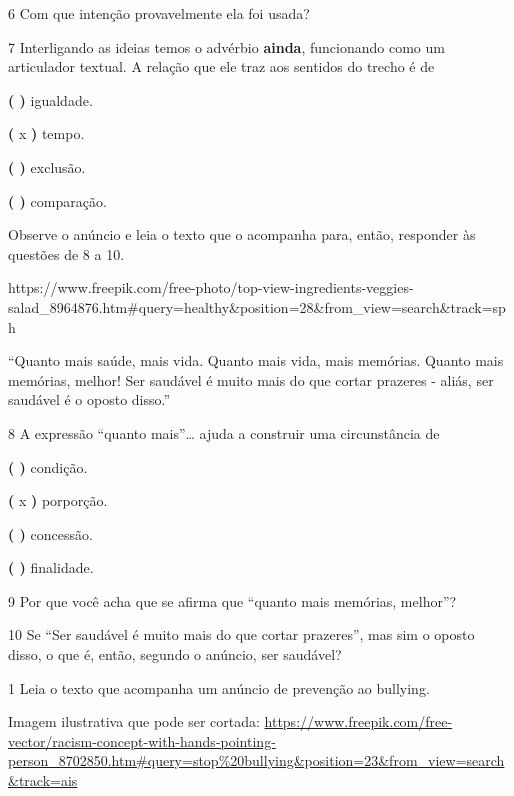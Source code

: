 \begin{itemize}
\begin{itemize}
{\begin{itemize}
\begin{itemize}
\num{6} Com que intenção provavelmente ela foi usada? 

\num{7} Interligando as ideias temos o advérbio \textbf{ainda},
funcionando como um articulador textual. A relação que ele traz aos
sentidos do trecho é de

\textbf{( )} igualdade.

\textbf{(} x \textbf{)} tempo.

\textbf{( )} exclusão.

\textbf{( )} comparação.

Observe o anúncio e leia o texto que o acompanha para, então, responder
às questões de 8 a 10.

https://www.freepik.com/free-photo/top-view-ingredients-veggies-salad\_8964876.htm\#query=healthy\&position=28\&from\_view=search\&track=sph

``Quanto mais saúde, mais vida. Quanto mais vida, mais memórias. Quanto
mais memórias, melhor! Ser saudável é muito mais do que cortar prazeres
- aliás, ser saudável é o oposto disso.''

\num{8} A expressão ``quanto mais''\ldots{} ajuda a construir uma
circunstância de

\textbf{( )} condição.

\textbf{(} x \textbf{)} porporção.

\textbf{( )} concessão.

\textbf{( )} finalidade.

\num{9} Por que você acha que se afirma que ``quanto mais memórias,
melhor''? 

\num{10} Se ``Ser saudável é muito mais do que cortar prazeres'', mas
sim o oposto disso, o que é, então, segundo o anúncio, ser saudável?


\num{1} Leia o texto que acompanha um anúncio de prevenção ao bullying.

Imagem ilustrativa que pode ser cortada:
\url{https://www.freepik.com/free-vector/racism-concept-with-hands-pointing-person_8702850.htm\#query=stop\%20bullying\&position=23\&from_view=search\&track=ais}


\end{itemize}
\end{itemize}}
\end{itemize}
\end{itemize}
